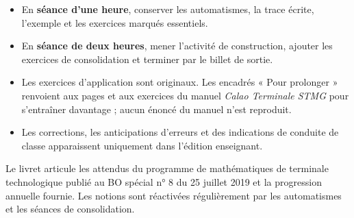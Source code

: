 \documentclass[11pt,a4paper,openany]{book}
\begin{document}
\begin{itemize}
\item En \textbf{séance d'une heure}, conserver les automatismes, la trace écrite, l'exemple et les exercices marqués essentiels.
\item En \textbf{séance de deux heures}, mener l'activité de construction, ajouter les exercices de consolidation et terminer par le billet de sortie.
\item Les exercices d'application sont originaux. Les encadrés « Pour prolonger » renvoient aux pages et aux exercices du manuel \emph{Calao Terminale STMG} pour s'entraîner davantage ; aucun énoncé du manuel n'est reproduit.
\item Les corrections, les anticipations d'erreurs et des indications de conduite de classe apparaissent uniquement dans l'édition enseignant.
\end{itemize}

\begin{retenir}
Le livret articule les attendus du programme de mathématiques de terminale technologique publié au BO spécial n° 8 du 25 juillet 2019 et la progression annuelle fournie. Les notions sont réactivées régulièrement par les automatismes et les séances de consolidation.
\end{retenir}

\tableofcontents
\mainmatter












\appendix




\end{document}
